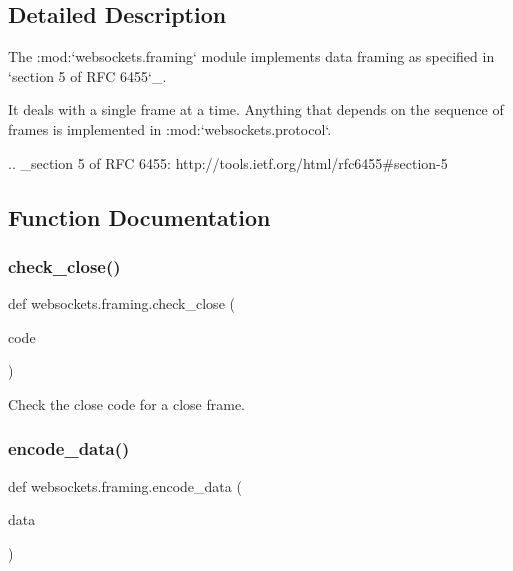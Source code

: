 \subsection{Detailed Description}
\begin{DoxyVerb}The :mod:`websockets.framing` module implements data framing as specified in
`section 5 of RFC 6455`_.

It deals with a single frame at a time. Anything that depends on the sequence
of frames is implemented in :mod:`websockets.protocol`.

.. _section 5 of RFC 6455: http://tools.ietf.org/html/rfc6455#section-5\end{DoxyVerb}
 

\subsection{Function Documentation}
\mbox{\label{namespacewebsockets_1_1framing_a9188aa9c6668705e1177726998a42b3e}} 
\subsubsection{\texorpdfstring{check\+\_\+close()}{check\_close()}}
{\footnotesize\ttfamily def websockets.\+framing.\+check\+\_\+close (\begin{DoxyParamCaption}\item[{}]{code }\end{DoxyParamCaption})}

\begin{DoxyVerb}Check the close code for a close frame.\end{DoxyVerb}
 \mbox{\label{namespacewebsockets_1_1framing_a2b818e33b862ae9d6aba510f28ff3054}} 
\subsubsection{\texorpdfstring{encode\+\_\+data()}{encode\_data()}}
{\footnotesize\ttfamily def websockets.\+framing.\+encode\+\_\+data (\begin{DoxyParamCaption}\item[{}]{data }\end{DoxyParamCaption})}

